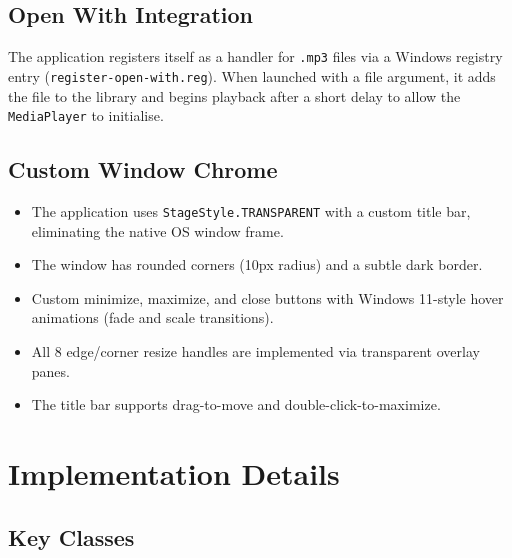 ﻿\documentclass[12pt]{report}
\begin{document}
\section{Open With Integration}
The application registers itself as a handler for \texttt{.mp3} files via a Windows registry entry (\texttt{register-open-with.reg}). When launched with a file argument, it adds the file to the library and begins playback after a short delay to allow the \texttt{MediaPlayer} to initialise.

\section{Custom Window Chrome}
\begin{itemize}
    \item The application uses \texttt{StageStyle.TRANSPARENT} with a custom title bar, eliminating the native OS window frame.
    \item The window has rounded corners (10px radius) and a subtle dark border.
    \item Custom minimize, maximize, and close buttons with Windows 11-style hover animations (fade and scale transitions).
    \item All 8 edge/corner resize handles are implemented via transparent overlay panes.
    \item The title bar supports drag-to-move and double-click-to-maximize.
\end{itemize}


\newpage
\chapter{Implementation Details}

\section{Key Classes}
\end{document}
